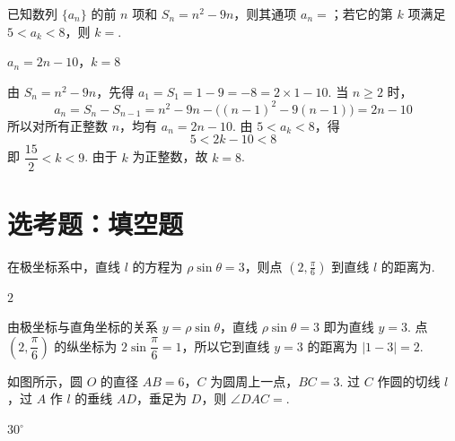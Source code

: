 \begin{problem}
已知数列 \(\{a_{n}\}\) 的前 \(n\) 项和 \(S_{n}=n^{2}-9n\)，则其通项 \(a_{n}=\)\fillinblank{}；若它的第 \(k\) 项满足 \(5<a_{k}<8\)，则 \(k=\)\fillinblank{}.
\end{problem}

\begin{answer}
\(a_n=2n-10\)，\(k=8\)
\end{answer}

\begin{solution}
由 \(S_n=n^2-9n\)，先得 \(a_1=S_1=1-9=-8=2\times1-10\). 当 \(n\geqslant2\) 时，
\[
a_n=S_n-S_{n-1}=n^2-9n-\bigl((n-1)^2-9(n-1)\bigr)=2n-10
\]
所以对所有正整数 \(n\)，均有 \(a_n=2n-10\). 由 \(5<a_k<8\)，得
\[
5<2k-10<8
\]
即 \(\dfrac{15}{2}<k<9\). 由于 \(k\) 为正整数，故 \(k=8\).
\end{solution}

\section{选考题：填空题}

\begin{problem}
在极坐标系中，直线 \(l\) 的方程为 \(\rho \sin \theta = 3\)，则点 \(\left(2, \frac{\pi}{6}\right)\) 到直线 \(l\) 的距离为\fillinblank{}.
\end{problem}

\begin{answer}
\(2\)
\end{answer}

\begin{solution}
由极坐标与直角坐标的关系 \(y=\rho\sin\theta\)，直线
\(\rho\sin\theta=3\) 即为直线 \(y=3\). 点
\(\left(2,\dfrac{\pi}{6}\right)\) 的纵坐标为
\(2\sin\dfrac{\pi}{6}=1\)，所以它到直线 \(y=3\) 的距离为
\(|1-3|=2\).
\end{solution}

\begin{problem}
如图所示，圆 \(O\) 的直径 \(AB = 6\)，\(C\) 为圆周上一点，\(BC = 3\). 过 \(C\) 作圆的切线 \(l\)，过 \(A\) 作 \(l\) 的垂线 \(AD\)，垂足为 \(D\)，则 \(\angle DAC =\)\fillinblank{}.

\end{problem}

\begin{answer}
\(30^\circ\)
\end{answer}


